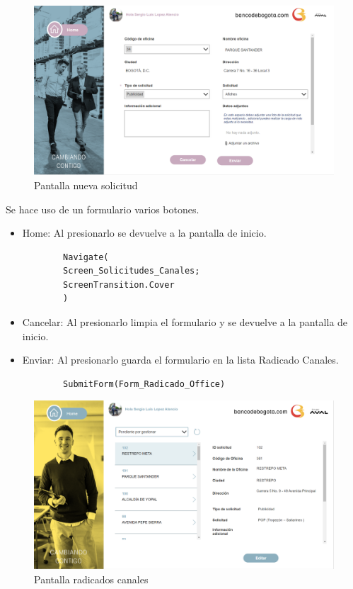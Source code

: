 \begin{figure}[H]
	\centering
	\includegraphics[scale=0.25]{Capitulo4/imagenes/19.png}
	\caption{Pantalla nueva solicitud}
	\label{Pform}
\end{figure}

Se hace uso de un formulario varios botones.
\begin{itemize}
	\item Home: Al presionarlo se devuelve a la pantalla de inicio.
	\begin{verbatim}
		Navigate(
		Screen_Solicitudes_Canales;
		ScreenTransition.Cover
		)
	\end{verbatim}
	\item Cancelar: Al presionarlo limpia el formulario y se devuelve a la pantalla de inicio.
	\item Enviar: Al presionarlo guarda el formulario en la lista Radicado Canales.
	\begin{verbatim}
		SubmitForm(Form_Radicado_Office)
	\end{verbatim}
\end{itemize}

\begin{figure}[H]
	\centering
	\includegraphics[scale=0.25]{Capitulo4/imagenes/20.png}
	\caption{Pantalla radicados canales}
	\label{PTotal}
\end{figure}

